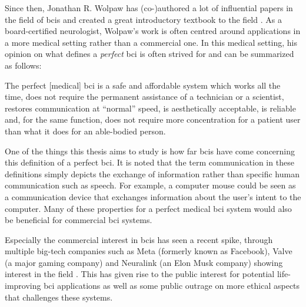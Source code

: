 Since then, Jonathan R. Wolpaw has (co-)authored a lot of influential papers in the field of \glspl{bci} \citep{bci_rehabilitation, bci_in_medicine, first_bci_meeting} and created a great introductory textbook to the field \citep{bci_book}.
As a board-certified neurologist, Wolpaw's work is often centred around applications in a more medical setting rather than a commercial one. In this medical setting, his opinion on what defines a \textit{perfect} \gls{bci} is often strived for and can be summarized as follows:

\setlength{\epigraphwidth}{0.9\textwidth}
\epigraph{The perfect [medical] \gls{bci} is a safe and affordable system which works all the time, does not require the permanent assistance of a technician or a scientist, restores communication at “normal” speed, is aesthetically acceptable, is reliable and, for the same function, does not require more concentration for a patient user than what it does for an able-bodied person.}{\textit{\citet{bci_book, cheap_bci_feasibility}}}


One of the things this thesis aims to study is how far \glspl{bci} have come concerning this definition of a perfect \gls{bci}.
It is noted that the term communication in these definitions simply depicts the exchange of information rather than specific human communication such as speech. For example, a computer mouse could be seen as a communication device that exchanges information about the user's intent to the computer.
Many of these properties for a perfect medical \gls{bci} system would also be beneficial for commercial \gls{bci} systems.

Especially the commercial interest in \glspl{bci} has seen a recent spike, through multiple big-tech companies such as Meta (formerly known as Facebook), Valve (a major gaming company) and Neuralink (an Elon Musk company) showing interest in the field \citep{facebook_bci_blog, bci_valve, neuralink_whitepaper}.
This has given rise to the public interest for potential life-improving \gls{bci} applications as well as some public outrage on more ethical aspects that challenges these systems. 

